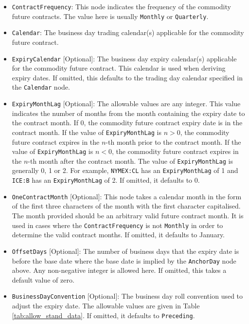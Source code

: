 \begin{itemize}
\begin{itemize}
    \end{itemize}
\item \lstinline!ContractFrequency!: This node indicates the frequency of the commodity future contracts. The value here is usually \lstinline!Monthly! or \lstinline!Quarterly!.
\item \lstinline!Calendar!: The business day trading calendar(s) applicable for the commodity future contract.
\item \lstinline!ExpiryCalendar! [Optional]: The business day expiry calendar(s) applicable for the commodity future contract. This calendar is used when deriving expiry dates. If omitted, this defaults to the trading day calendar specified in the \lstinline!Calendar! node.
\item \lstinline!ExpiryMonthLag! [Optional]: The allowable values are any integer. This value indicates the number of months from the month containing the expiry date to the contract month. If 0, the commodity future contract expiry date is in the contract month. If the value of \lstinline!ExpiryMonthLag! is $n > 0$, the commodity future contract expires in the $n$-th month prior to the contract month. If the value of \lstinline!ExpiryMonthLag! is $n < 0$, the commodity future contract expires in the $n$-th month after the contract month. The value of \lstinline!ExpiryMonthLag! is generally 0, 1 or 2. For example, \lstinline!NYMEX:CL! has an \lstinline!ExpiryMonthLag! of 1 and \lstinline!ICE:B! has an \lstinline!ExpiryMonthLag! of 2. If omitted, it defaults to 0.
\item \lstinline!OneContractMonth! [Optional]: This node takes a calendar month in the form of the first three characters of the month with the first character capitalised. The month provided should be an arbitrary valid future contract month. It is used in cases where the \lstinline!ContractFrequency! is not \lstinline!Monthly! in order to determine the valid contract months. If omitted, it defaults to January.
\item \lstinline!OffsetDays! [Optional]: The number of business days that the expiry date is before the base date where the base date is implied by the \lstinline!AnchorDay! node above. Any non-negative integer is allowed here. If omitted, this takes a default value of zero.
\item \lstinline!BusinessDayConvention! [Optional]: The business day roll convention used to adjust the expiry date. The allowable values are given in Table \ref{tab:allow_stand_data}. If omitted, it defaults to \lstinline!Preceding!.

\end{itemize}
